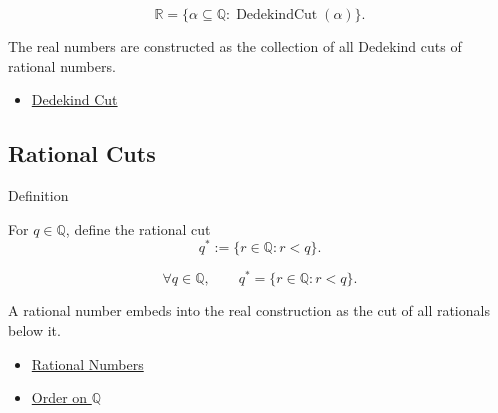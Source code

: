 
\begin{remark*}
\[
\mathbb{R}=\{\alpha\subseteq\mathbb{Q}:\operatorname{DedekindCut}(\alpha)\}.
\]
\end{remark*}

\begin{remark*}[Interpretation]
The real numbers are constructed as the collection of all Dedekind cuts of rational numbers.
\end{remark*}

\begin{dependencies}
\begin{itemize}
  \item \hyperref[def:dedekind-cut]{Dedekind Cut}
\end{itemize}
\end{dependencies}

\subsection*{Rational Cuts}

\begin{definitionbox}{Definition}
\begin{definition}
\label{def:rational-cut}
For $q\in\mathbb{Q}$, define the rational cut
\[
q^{\ast}:=\{r\in\mathbb{Q}:r<q\}.
\]
\end{definition}
\end{definitionbox}

\begin{remark*}
\[
\forall q\in\mathbb{Q},\qquad
q^{\ast}=\{r\in\mathbb{Q}:r<q\}.
\]
\end{remark*}

\begin{remark*}[Interpretation]
A rational number embeds into the real construction as the cut of all rationals below it.
\end{remark*}

\begin{dependencies}
\begin{itemize}
  \item \hyperref[def:rationals]{Rational Numbers}
  \item \hyperref[def:order-on-q]{Order on $\mathbb{Q}$}
\end{itemize}
\end{dependencies}

